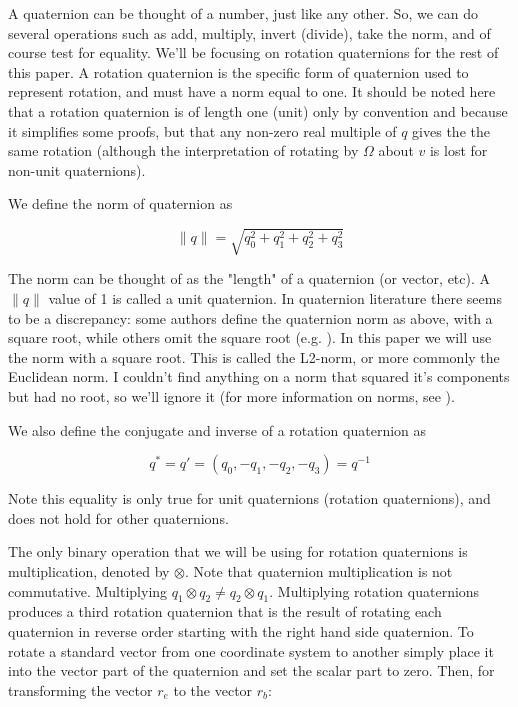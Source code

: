 \documentclass{article}
\numberwithin{equation}{section} %
\begin{document}
A quaternion can be thought of a number, just like any other. So, we can do several operations such as add, multiply, invert (divide), take the norm, and of course test for equality. We'll be focusing on rotation quaternions for the rest of this paper. A rotation quaternion is the specific form of quaternion used to represent rotation, and must have a norm equal to one. It should be noted here that a rotation quaternion is of length one (unit) only by convention and because it simplifies some proofs, but that any non-zero real multiple of $q$ gives the the same rotation (although the interpretation of rotating by $\Omega$ about $v$ is lost for non-unit quaternions).

We define the norm of quaternion as

$$ \lVert q \rVert = \sqrt{q_0^2 + q_1^2 + q_2^2 + q_3^2} $$

The norm can be thought of as the "length" of a quaternion (or vector, etc). A $ \lVert q \rVert $ value of 1 is called a unit quaternion. In quaternion literature there seems to be a discrepancy: some authors define the quaternion norm as above, with a square root, while others omit the square root (e.g. \cite{shoemake69}). In this paper we will use the norm with a square root. This is called the L2-norm, or more commonly the Euclidean norm. I couldn't find anything on a norm that squared it's components but had no root, so we'll ignore it (for more information on norms, see \cite{malek09}).

We also define the conjugate and inverse of a rotation quaternion as

$$ q^* = q' = \left(q_0, -q_1, -q_2, -q_3 \right) = q^{-1} $$

Note this equality is only true for unit quaternions (rotation quaternions), and does not hold for other quaternions.

The only binary operation that we will be using for rotation quaternions is multiplication, denoted by $ \otimes$. Note that quaternion multiplication is not commutative. Multiplying $q_1 \otimes q_2 \neq q_2 \otimes q_1 $. Multiplying rotation quaternions produces a third rotation quaternion that is the result of rotating each quaternion in reverse order starting with the right hand side quaternion. To rotate a standard vector from one coordinate system to another simply place it into the vector part of the quaternion and set the scalar part to zero. Then, for transforming the vector $r_e$ to the vector $r_b$:
\end{document}
